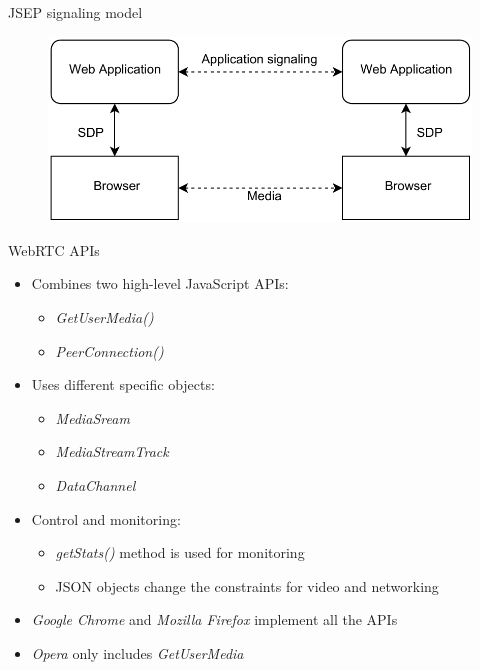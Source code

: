 \documentclass[first=red,second=purple,logo=yellowexc]{aaltoslides}
\begin{document}
\begin{frame}{JSEP signaling model}

\begin{figure}[h]
  \centering
  \includegraphics[width=1\textwidth]{JSEP.pdf}
\end{figure}

\end{frame}

\begin{frame}{WebRTC APIs}

\begin{itemize}
\item Combines two high-level JavaScript APIs:
\begin{itemize}
\item {\it GetUserMedia()}
\item {\it PeerConnection()}
\end{itemize}
\item Uses different specific objects:
\begin{itemize}
\item {\it MediaSream}
\item {\it MediaStreamTrack}
\item {\it DataChannel}
\end{itemize}
\item Control and monitoring:
\begin{itemize}
\item {\it getStats()} method is used for monitoring
\item JSON objects change the constraints for video and networking
\end{itemize}
\item {\it Google Chrome} and {\it Mozilla Firefox} implement all the APIs
\item {\it Opera} only includes {\it GetUserMedia}
\end{itemize}
\end{frame}
\end{document}
